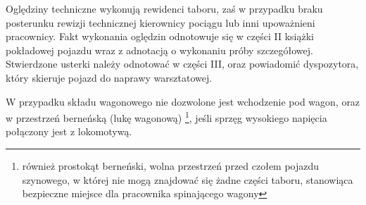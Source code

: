 Oględziny techniczne wykonują rewidenci taboru, zaś w przypadku braku posterunku rewizji technicznej kierownicy pociągu lub inni upoważnieni pracownicy. Fakt wykonania oględzin odnotowuje się w części II książki pokładowej pojazdu wraz z adnotacją o wykonaniu próby szczegółowej. Stwierdzone usterki należy odnotować w części III, oraz powiadomić dyspozytora, który skieruje pojazd do naprawy warsztatowej.

W przypadku składu wagonowego nie dozwolone jest wchodzenie pod wagon, oraz w przestrzeń berneńską (lukę wagonową) \footnote{również prostokąt berneński, wolna przestrzeń przed czołem pojazdu szynowego, w której nie mogą znajdować się żadne części taboru, stanowiąca bezpieczne miejsce dla pracownika spinającego wagony}, jeśli sprzęg wysokiego napięcia połączony jest z lokomotywą. 

